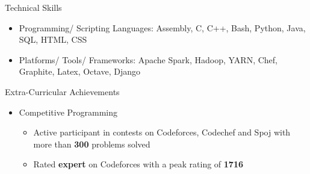 \documentclass{article}
\begin{document}
{\Large Technical Skills}
\renewcommand{\labelitemi}{$\bullet$}
\begin{itemize}[leftmargin=0.82cm]
\item Programming/ Scripting Languages: Assembly, C, C++, Bash, Python, Java, SQL, HTML, CSS
\item Platforms/ Tools/ Frameworks: Apache Spark, Hadoop, YARN,  Chef, Graphite, Latex, Octave, Django
\end{itemize}
\renewcommand{\labelitemii}{$\bullet$}
{\Large Extra-Curricular Achievements}
\begin{itemize}[leftmargin=0.07cm]
\item[] {\large Competitive Programming}
	\begin{itemize}
	\item Active participant in contests on Codeforces, Codechef and Spoj with more than \textbf{300} problems solved
	\item Rated \textbf{expert} on Codeforces with a peak rating of \textbf{1716}
	\end{itemize}
\end{itemize}
\end{document}
